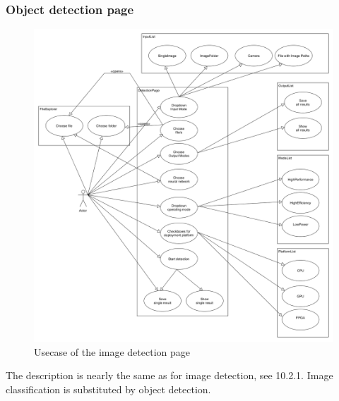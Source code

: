 \documentclass[parskip=full]{scrartcl}
\begin{document}
\subsubsection{Object detection page}
\begin{figure}[htb!]
\centering
\includegraphics[width=\textwidth]{objectDetectionUsecase}
\caption{Usecase of the image detection page}
\end{figure}
The description is nearly the same as for image detection, see 10.2.1. Image classification is substituted by object detection.
\newpage
\end{document}
